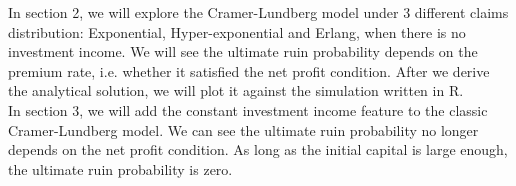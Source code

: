 \documentclass[12pt]{article}
\begin{document}
In section 2, we will explore the Cramer-Lundberg model under 3 different claims distribution: Exponential, Hyper-exponential and Erlang, when there is no investment income. We will see the ultimate ruin probability depends on the premium rate, i.e. whether it satisfied the net profit condition. After we derive the analytical solution, we will plot it against the simulation written in R.\\

In section 3, we will add the constant investment income feature to the classic Cramer-Lundberg model. We can see the ultimate ruin probability no longer depends on the net profit condition. As long as the initial capital is large enough, the ultimate ruin probability is zero.\\


\newpage
\end{document}
